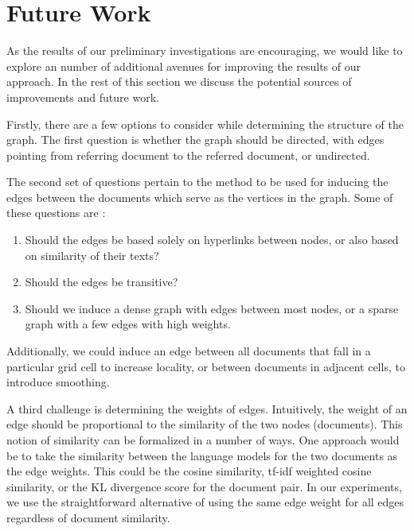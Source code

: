 \section{Future Work}  

As the results of our preliminary investigations are encouraging, we would like to explore an number of additional avenues
for improving the results of our approach. In the rest of this section we discuss the potential sources of improvements and future work.

\par Firstly, there are a few options to consider while determining the structure of the
graph. The first question is whether the graph should be directed, with edges
pointing from referring document to the referred document, or undirected. 

\par The second set of questions pertain to the method to be used for inducing
the edges between the documents which serve as the vertices in the graph. Some of these questions are :

\begin{enumerate}
\item Should the edges be based solely on hyperlinks between nodes, or also based on similarity of their texts?
\item Should the edges be transitive?
\item Should we induce a dense graph with edges between most nodes, or a sparse graph with a few edges with high weights. 
\end{enumerate}

Additionally, we could induce an edge between
all documents that fall in a particular grid cell to increase locality, or
between documents in adjacent cells, to introduce smoothing.

\par A third challenge is determining the weights of edges. Intuitively, the
weight of an edge should be proportional to the similarity of the two nodes
(documents). This notion of similarity can be formalized in a number of ways.
One approach would be to take the similarity between the language models for
the two documents as the edge weights. This could be the cosine similarity,
tf-idf weighted cosine similarity, or the KL divergence score for the document pair. 
In our experiments, we use the straightforward alternative of using the 
same edge weight for all edges regardless of document similarity.

